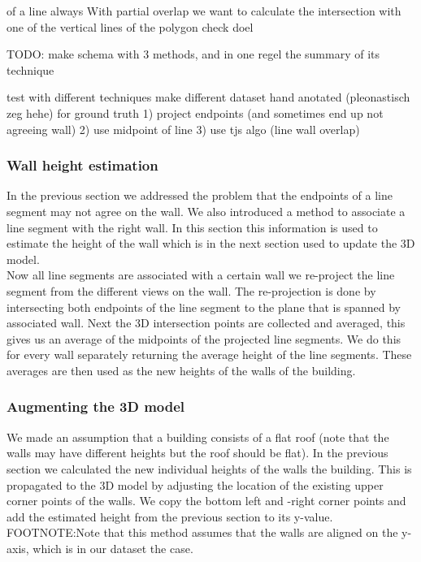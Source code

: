 \documentclass[10pt]{article}
\begin{document}
	 of a line always 
	With partial overlap we want to calculate the intersection with one of the vertical lines of the polygon
	check
	doel



	TODO:
	make schema with 3 methods, and in one regel the summary of its technique
	
	test with different techniques
	make different dataset
	hand anotated (pleonastisch zeg hehe) for ground truth
	1) project endpoints (and sometimes end up not agreeing wall)
	2) use midpoint of line
	3) use tjs algo (line wall overlap)


\subsubsection{Wall height estimation}
	In the previous section we addressed the problem that the endpoints of a line segment may not agree on the wall.  We also introduced a method to associate a line segment with the right wall. In this section this information is used to estimate the height of the wall which is in the next section used to update the 3D model.\\
	Now all line segments are associated with a certain wall we re-project the line segment from the different views on the wall. The re-projection is done by intersecting both endpoints of the line segment to the plane that is spanned by associated wall.
	Next the 3D intersection points are collected and averaged, this gives us an average of the midpoints of the projected line segments. We do this for every wall separately returning the average height of the line segments.
	These averages are then used as the new heights of the walls of the building.

\subsubsection{Augmenting the 3D model} %
	We made an assumption that a building consists of a flat roof (note that the walls may have different heights but the roof should be flat).
	In the previous section we calculated the new individual heights of the walls the building. 
	This is propagated to the 3D model by adjusting the location of the existing upper corner points of the walls. We copy the bottom left and -right corner points and add the estimated height from the previous section to its y-value.
	FOOTNOTE:Note that this method assumes that the walls are aligned on the y-axis, which is in our dataset the case.
\end{document}
